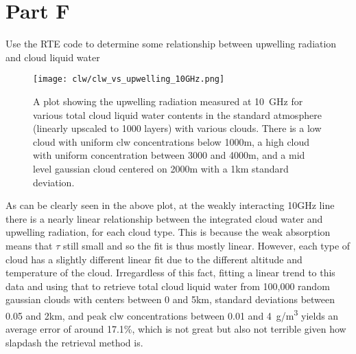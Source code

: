 \documentclass{article}
\begin{document}
\section*{Part F}
Use the RTE code to determine some relationship between upwelling radiation and cloud liquid water
\begin{figure}[H]
    \texttt{[image: clw/clw\_vs\_upwelling\_10GHz.png]}
    \caption{A plot showing the upwelling radiation measured at \qty{10}{GHz} for various total cloud liquid water contents in the standard atmosphere (linearly upscaled to 1000 layers) with various clouds. There is a low cloud with uniform clw concentrations below 1000m, a high cloud with uniform concentration between 3000 and 4000m, and a mid level gaussian cloud centered on 2000m with a 1km standard deviation.}
\end{figure}

As can be clearly seen in the above plot, at the weakly interacting 10GHz line there is a nearly linear relationship between the integrated cloud water and upwelling radiation, for each cloud type. This is because the weak absorption means that $\tau$ still small and so the fit is thus mostly linear. However, each type of cloud has a slightly different linear fit due to the different altitude and temperature of the cloud. Irregardless of this fact, fitting a linear trend to this data and using that to retrieve total cloud liquid water from 100,000 random gaussian clouds with centers between 0 and 5km, standard deviations between 0.05 and 2km, and peak clw concentrations between 0.01 and \qty{4}{g/m^3} yields an average error of around 17.1\%, which is not great but also not terrible given how slapdash the retrieval method is.
\end{document}
